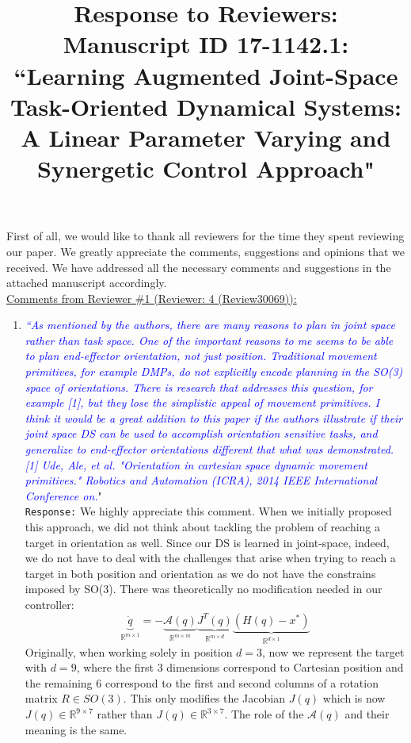 \documentclass{article}
\title{Response to Reviewers: Manuscript ID 17-1142.1: ``Learning Augmented Joint-Space Task-Oriented Dynamical Systems: A Linear Parameter Varying and Synergetic Control Approach"}
\begin{document}
\maketitle
First of all, we would like to thank all reviewers for the time they spent reviewing our paper. We greatly appreciate the comments, suggestions and opinions that we received. We have addressed all the necessary comments and suggestions in the attached manuscript accordingly.\\
\noindent \underline{Comments from Reviewer \#1 (Reviewer: 4 (Review30069)):}
\begin{enumerate}
\item \textcolor{blue}{\textit{``As mentioned by the authors, there are many reasons to plan in joint space rather than task space. One of the important reasons to me seems to be able to plan end-effector orientation, not just position. Traditional movement primitives, for example DMPs, do not explicitly encode planning in the SO(3) space of orientations. There is research that addresses this question, for example [1], but they lose the simplistic appeal of movement primitives. I think it would be a great addition to this paper if the authors illustrate if their joint space DS can be used to accomplish orientation sensitive tasks, and generalize to end-effector orientations different that what was demonstrated.[1] Ude, Ale, et al. "Orientation in cartesian space dynamic movement primitives." Robotics and Automation (ICRA), 2014 IEEE International Conference on.}}"\\
\texttt{Response:}  We highly appreciate this comment. When we initially proposed this approach, we did not think about tackling the problem of reaching a target in orientation as well. Since our DS is learned in joint-space, indeed, we do not have to deal with the challenges that arise when trying to reach a target in both position and orientation as we do not have the constrains imposed by SO(3). There was theoretically no modification needed in our controller:
\begin{equation}
\underbrace{\dot{q}}_{\mathbb{R}^{m\times 1}} = -\underbrace{\mathcal{A}(q)}_{\mathbb{R}^{m\times m}}\underbrace{J^{T}(q)}_{\mathbb{R}^{m\times d}}\underbrace{(H(q)-x^*)}_{\mathbb{R}^{d\times 1}}
\label{eq:jtds}
\end{equation}
Originally, when working solely in position $d=3$, now we represent the target with $d=9$, where the first 3 dimensions correspond to Cartesian position and the remaining 6 correspond to the first and second columns of a rotation matrix $R \in SO(3)$. This only modifies the Jacobian $J(q)$ which is now $J(q)\in \mathbb{R}^{9 \times 7}$ rather than $J(q)\in \mathbb{R}^{3 \times 7}$. The role of the $\mathcal{A}(q)$ and their meaning is the same.




\end{enumerate}
\end{document}
